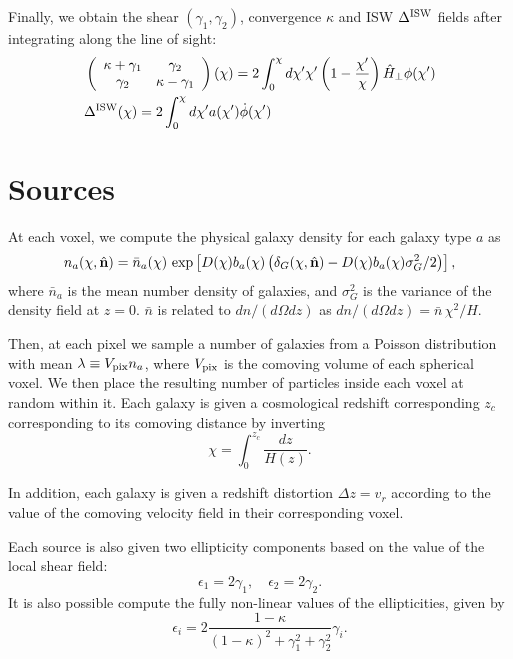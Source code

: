 \documentclass[a4paper,10pt]{article}
\begin{document}
  Finally, we obtain the shear $(\gamma_1,\gamma_2)$, convergence $\kappa$
  and ISW $\Delta^{\rm ISW}$ fields after integrating along the line
  of sight:
  \begin{align}
    &\left(
    \begin{array}{cc}
      \kappa+\gamma_1 & \gamma_2\\
      \gamma_2 & \kappa-\gamma_1
    \end{array}\right)(\chi)=
    2\int_0^\chi d\chi'\chi'\left(1-\frac{\chi'}{\chi}\right)\hat{H}_\perp\phi(\chi')\\
    &\Delta^{\rm ISW}(\chi)=2\int_0^\chi d\chi'a(\chi')\dot{\phi}(\chi')
  \end{align}    


\section{Sources}
  At each voxel, we compute the physical galaxy density for each galaxy
  type $a$ as
  \begin{equation}
    n_a(\chi,\hat{\bf n})=
    \bar{n}_a(\chi)\,
    \exp\left[D(\chi)b_a(\chi)\left(\delta_G(\chi,\hat{\bf n})-
      D(\chi)b_a(\chi)\sigma_G^2/2\right)\right],
  \end{equation}
  where $\bar{n}_a$ is the mean number density of galaxies, and $\sigma_G^2$
  is the variance of the density field at $z=0$. $\bar{n}$ is related to
  $dn/(d\Omega dz)$ as $dn/(d\Omega dz)=\bar{n}\,\chi^2/H$.

  Then, at each pixel we sample a number of galaxies from a Poisson distribution with mean
  $\lambda\equiv V_{\rm pix}n_a$, where $V_{\rm pix}$ is the comoving volume of each
  spherical voxel. We then place the resulting number of particles inside each voxel at
  random within it. Each galaxy is given a cosmological redshift corresponding $z_c$
  corresponding to its comoving distance by inverting
  \begin{equation}
    \chi=\int_0^{z_c}\frac{dz}{H(z)}.
  \end{equation}

  In addition, each galaxy is given a redshift distortion $\Delta z=v_r$ according to the
  value of the comoving velocity field in their corresponding voxel.

  Each source is also given two ellipticity components based on the value of the local
  shear field:
  \begin{equation}
    \epsilon_1=2\gamma_1,\hspace{12pt}\epsilon_2=2\gamma_2.
  \end{equation}
  It is also possible compute the fully non-linear values of the ellipticities, given
  by
  \begin{equation}
    \epsilon_i=2\frac{1-\kappa}{(1-\kappa)^2+\gamma_1^2+\gamma_2^2}\gamma_i.
  \end{equation}
\end{document}
